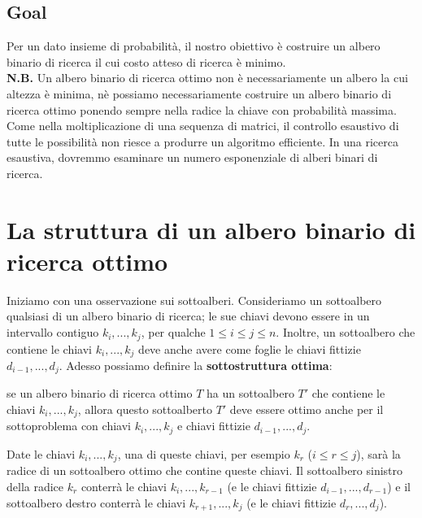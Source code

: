 \subsection{Goal}

Per un dato insieme di probabilità, il nostro obiettivo è costruire un
albero binario di ricerca il cui costo atteso di ricerca è minimo.\\

\textbf{N.B.} Un albero binario di ricerca ottimo non è necessariamente
un albero la cui altezza è minima, nè possiamo necessariamente costruire
un albero binario di ricerca ottimo ponendo sempre nella radice la
chiave con probabilità massima.\\

Come nella moltiplicazione di una sequenza di matrici, il controllo
esaustivo di tutte le possibilità non riesce a produrre un algoritmo
efficiente. In una ricerca esaustiva, dovremmo esaminare un numero
esponenziale di alberi binari di ricerca.


\section{La struttura di un albero binario di ricerca ottimo}

Iniziamo con una osservazione sui sottoalberi. Consideriamo un
sottoalbero qualsiasi di un albero binario di ricerca; le sue chiavi
devono essere in un intervallo contiguo $k_i, ..., k_j$, per qualche
$1 \le i \le j \le n$. Inoltre, un sottoalbero che contiene le chiavi
$k_i, ..., k_j$ deve anche avere come foglie le chiavi fittizie
$d_{i-1}, ..., d_j$. Adesso possiamo definire la
\textbf{sottostruttura ottima}:
\begin{myblockquote}
  se un albero
  binario di ricerca ottimo $T$ ha un sottoalbero $T'$ che contiene le
  chiavi $k_i, ..., k_j$, allora questo sottoalberto $T'$ deve essere
  ottimo anche per il sottoproblema con chiavi $k_i, ..., k_j$ e chiavi
  fittizie $d_{i-1}, ..., d_j$.
\end{myblockquote}
Date le chiavi $k_i, ..., k_j$, una di queste chiavi, per esempio
$k_r$ ($i \le r \le j$), sarà la radice di un sottoalbero ottimo che
contine queste chiavi. Il sottoalbero sinistro della radice $k_r$
conterrà le chiavi $k_i, ..., k_{r-1}$ (e le chiavi fittizie
$d_{i-1}, ..., d_{r-1}$) e il sottoalbero destro conterrà le chiavi
$k_{r+1}, ..., k_j$ (e le chiavi fittizie $d_{r}, ..., d_{j}$).\\

